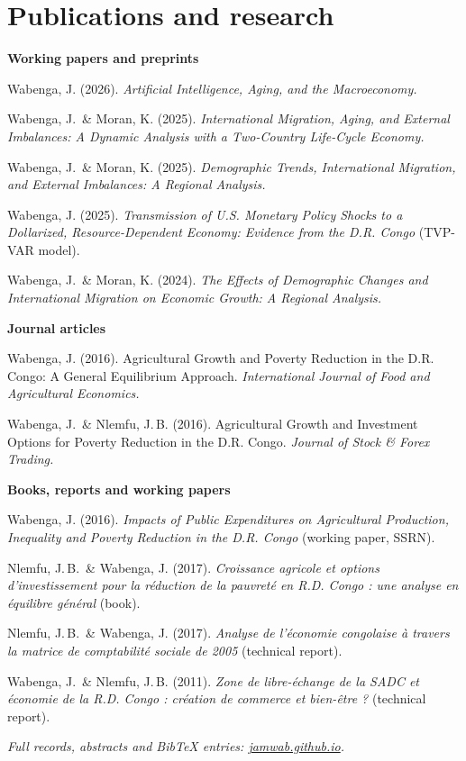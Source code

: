 \documentclass[11pt,letterpaper]{article}
\newcommand{\meta}[1]{{\small\itshape\color{soft}#1}}
\begin{document}
\section{Publications and research}
\textbf{Working papers and preprints}
\begin{tight}
  \item Wabenga, J. (2026). \textit{Artificial Intelligence, Aging, and the Macroeconomy.}
  \item Wabenga, J.\ \& Moran, K. (2025). \textit{International Migration, Aging, and External Imbalances: A Dynamic Analysis with a Two-Country Life-Cycle Economy.}
  \item Wabenga, J.\ \& Moran, K. (2025). \textit{Demographic Trends, International Migration, and External Imbalances: A Regional Analysis.}
  \item Wabenga, J. (2025). \textit{Transmission of U.S. Monetary Policy Shocks to a Dollarized, Resource-Dependent Economy: Evidence from the D.R. Congo} (TVP-VAR model).
  \item Wabenga, J.\ \& Moran, K. (2024). \textit{The Effects of Demographic Changes and International Migration on Economic Growth: A Regional Analysis.}
\end{tight}
\textbf{Journal articles}
\begin{tight}
  \item Wabenga, J. (2016). Agricultural Growth and Poverty Reduction in the D.R. Congo: A General Equilibrium Approach. \textit{International Journal of Food and Agricultural Economics.}
  \item Wabenga, J.\ \& Nlemfu, J.\,B. (2016). Agricultural Growth and Investment Options for Poverty Reduction in the D.R. Congo. \textit{Journal of Stock \& Forex Trading.}
\end{tight}
\textbf{Books, reports and working papers}
\begin{tight}
  \item Wabenga, J. (2016). \textit{Impacts of Public Expenditures on Agricultural Production, Inequality and Poverty Reduction in the D.R. Congo} (working paper, SSRN).
  \item Nlemfu, J.\,B.\ \& Wabenga, J. (2017). \textit{Croissance agricole et options d'investissement pour la réduction de la pauvreté en R.D. Congo : une analyse en équilibre général} (book).
  \item Nlemfu, J.\,B.\ \& Wabenga, J. (2017). \textit{Analyse de l'économie congolaise à travers la matrice de comptabilité sociale de 2005} (technical report).
  \item Wabenga, J.\ \& Nlemfu, J.\,B. (2011). \textit{Zone de libre-échange de la SADC et économie de la R.D. Congo : création de commerce et bien-être ?} (technical report).
\end{tight}
\meta{Full records, abstracts and BibTeX entries: \href{https://jamwab.github.io}{jamwab.github.io}.}
\end{document}
